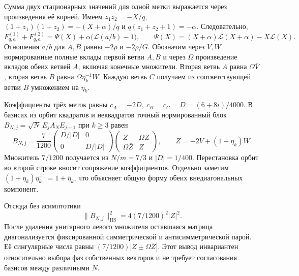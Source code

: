 \documentclass[11pt,a4paper]{article}
\newcommand{\HS}{\mathrm{HS}}
\begin{document}
Сумма двух стационарных значений для одной метки выражается через произведения её корней. Имеем \(z_1z_2=-X/q\), \((1+z_1)(1+z_2)=-(X+\alpha)/q\) и \(q(z_1+z_2+1)=-\alpha\). Следовательно,
\[
 F_{q,a}^{(1)}+F_{q,a}^{(2)}
     =\Psi(X)+\alpha\bigl(\mathcal L(a/b)-1\bigr),\qquad
 \Psi(X)=(X+\alpha)\mathcal L(X+\alpha)-X\mathcal L(X).
\]
Отношения \(a/b\) для \(A,B\) равны \(-2\rho\) и \(-2\rho/G\). Обозначим через \(V,W\) нормированные полные вклады первой ветви \(A,B\) и через \(\Omega\) произведение вкладов обеих ветвей \(A\), включая конечные множители. Вторая ветвь \(A\) равна \(\Omega\bar V\), вторая ветвь \(B\) равна \(\Omega\eta_k^{-1}\bar W\). Каждую ветвь \(C\) получаем из соответствующей ветви \(B\) умножением на \(\eta_k\).

Коэффициенты трёх меток равны \(c_A=-2D,\ c_B=c_C=D=(6+8i)/4000\). В базисах из орбит квадратов и неквадратов точный нормированный блок \(B_{N,j}=\sqrt N\,E_jA_NE_{j+1}\) при \(k\ge3\) равен
\begin{equation}
 B_{N,j}=\frac7{1200}
   \begin{pmatrix} D/|D|&0\\0&\bar D/|D|\end{pmatrix}
   \begin{pmatrix} Z&\Omega\bar Z\\\Omega\bar Z&Z\end{pmatrix},
 \qquad Z=-2V+(1+\eta_k)W. \label{eq:block}
\end{equation}
Множитель \(7/1200\) получается из \(N/m=7/3\) и \(|D|=1/400\). Перестановка орбит во второй строке вносит сопряжение коэффициентов. Отдельно заметим \((1+\eta_k)\eta_k^{-1}=1+\bar\eta_k\), что объясняет общую форму обеих внедиагональных компонент.

Отсюда без асимптотики
\[
       \|B_{N,j}\|_{\HS}^2=4(7/1200)^2|Z|^2 .
\]
После удаления унитарного левого множителя оставшаяся матрица диагонализуется фиксированной симметрической и антисимметрической парой. Её сингулярные числа равны \((7/1200)|Z\pm\Omega\bar Z|\). Этот вывод инвариантен относительно выбора фаз собственных векторов и не требует согласования базисов между различными \(N\).
\end{document}
